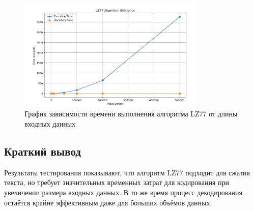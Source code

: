 \begin{figure}
\centering
\includegraphics[width=0.8\textwidth]{test.png}
\caption{График зависимости времени выполнения алгоритма LZ77 от длины входных данных}
\label{fig:performance}
\end{figure}

\subsection*{Краткий вывод}

Результаты тестирования показывают, что алгоритм LZ77 подходит для сжатия текста, но требует значительных временных затрат для кодирования при увеличении размера входных данных. В то же время процесс декодирования остаётся крайне эффективным даже для больших объёмов данных.
